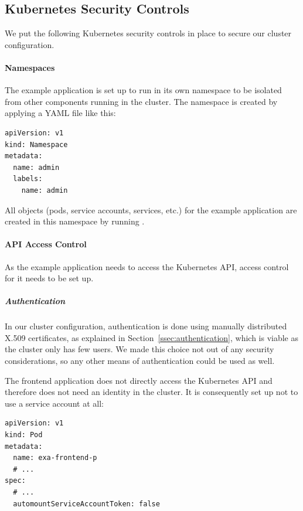 \subsection{Kubernetes Security Controls} \label{ssec:exaLayer3}

We put the following Kubernetes security controls in place to secure our cluster configuration.

\paragraph{Namespaces}

The example application is set up to run in its own namespace  to be isolated from other components running in the cluster. The namespace is created by applying a YAML file like this:

\begin{verbatim}
apiVersion: v1
kind: Namespace
metadata:
  name: admin
  labels:
    name: admin
\end{verbatim}

All objects (pods, service accounts, services, etc.) for the example application are created in this namespace by running .

\paragraph{API Access Control}

As the example application needs to access the Kubernetes API, access control for it needs to be set up.

\subparagraph{Authentication}
In our cluster configuration, authentication is done using manually distributed X.509 certificates, as explained in Section~\ref{ssec:authentication}, which is viable as the cluster only has few users. We made this choice not out of any security considerations, so any other means of authentication could be used as well. 

The frontend application does not directly access the Kubernetes API and therefore does not need an identity in the cluster. It is consequently set up not to use a service account at all:

\begin{verbatim}
apiVersion: v1
kind: Pod
metadata:
  name: exa-frontend-p
  # ...
spec:
  # ...
  automountServiceAccountToken: false
\end{verbatim}

